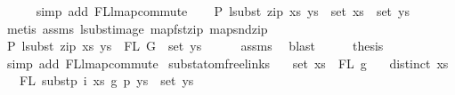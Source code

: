 \begin{isabellebody}
\ \ \ \ \isamarkupfalse%
\ {\isacharparenleft}{\kern0pt}simp\ add{\isacharcolon}{\kern0pt}\ FL{\isacharunderscore}{\kern0pt}lmap{\isacharunderscore}{\kern0pt}commute{\isacharparenright}{\kern0pt}\isanewline
\ \ \isamarkupfalse%
\ P{}{\isacharcolon}{\kern0pt}\ {\isachardoublequoteopen}lsubst\ {\isacharparenleft}{\kern0pt}zip\ xs\ ys{\isacharparenright}{\kern0pt}\ {\isacharbackquote}{\kern0pt}\ set\ xs\ {\isacharequal}{\kern0pt}\ set\ ys{\isachardoublequoteclose}\isanewline
\ \ \ \ \isamarkupfalse%
\ {\isacharparenleft}{\kern0pt}metis\ assms{\isacharparenleft}{\kern0pt}{}{\isacharcomma}{\kern0pt}{}{\isacharparenright}{\kern0pt}\ lsubst{\isacharunderscore}{\kern0pt}image\ map{\isacharunderscore}{\kern0pt}fst{\isacharunderscore}{\kern0pt}zip\ map{\isacharunderscore}{\kern0pt}snd{\isacharunderscore}{\kern0pt}zip{\isacharparenright}{\kern0pt}\isanewline
\ \ \isamarkupfalse%
\ \isamarkupfalse%
\ P{}{\isacharcolon}{\kern0pt}\ {\isachardoublequoteopen}lsubst\ {\isacharparenleft}{\kern0pt}zip\ xs\ ys{\isacharparenright}{\kern0pt}\ {\isacharbackquote}{\kern0pt}\ FL\ G\ {\isasymsubseteq}\ set\ ys{\isachardoublequoteclose}\isanewline
\ \ \ \ \isamarkupfalse%
\ assms{\isacharparenleft}{\kern0pt}{}{\isacharparenright}{\kern0pt}\ \isamarkupfalse%
\ blast\isanewline
\ \ \isamarkupfalse%
\ \isamarkupfalse%
\ {\isacharquery}{\kern0pt}thesis\isanewline
\ \ \ \ \isamarkupfalse%
\ {\isacharparenleft}{\kern0pt}simp\ add{\isacharcolon}{\kern0pt}\ FL{\isacharunderscore}{\kern0pt}lmap{\isacharunderscore}{\kern0pt}commute{\isacharparenright}{\kern0pt}\isanewline
{}\isamarkupfalse%
%
\endisatagproof
{\isafoldproof}%
%
\isadelimproof
%
\endisadelimproof
%
\isadelimdocument
%
\endisadelimdocument
%
\isatagdocument
%
\isamarkuptrue%
%
\endisatagdocument
{\isafolddocument}%
%
\isadelimdocument
%
\endisadelimdocument
{}\isamarkupfalse%
\ subst{\isacharunderscore}{\kern0pt}atom{\isacharunderscore}{\kern0pt}freelinks{\isacharcolon}{\kern0pt}\isanewline
\ \ \ {\isachardoublequoteopen}set\ xs\ {\isacharequal}{\kern0pt}\ FL\ g{}{\isachardoublequoteclose}\isanewline
\ \ \ {\isachardoublequoteopen}distinct\ xs{\isachardoublequoteclose}\isanewline
\ \ \ {\isachardoublequoteopen}FL\ {\isacharparenleft}{\kern0pt}subst{\isacharunderscore}{\kern0pt}p\ i\ xs\ g{}\ p\ ys{\isacharparenright}{\kern0pt}\ {\isacharequal}{\kern0pt}\ set\ ys{\isachardoublequoteclose}\isanewline

\end{isabellebody}
